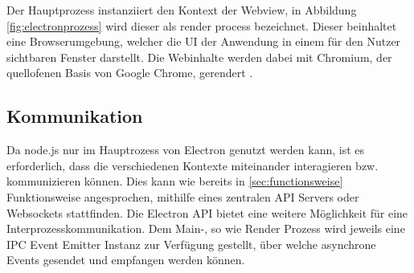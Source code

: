 Der Hauptprozess instanziiert den Kontext der Webview, in Abbildung \ref{fig:electronprozess} wird dieser als render process bezeichnet.
Dieser beinhaltet eine Browserumgebung, welcher die \ac{UI} der Anwendung in einem für den Nutzer sichtbaren Fenster darstellt.
Die Webinhalte werden dabei mit Chromium, der quellofenen Basis von Google Chrome, gerendert \cite{Build58:online}.

\subsection{Kommunikation}

Da node.js nur im Hauptrozess von Electron genutzt werden kann, ist es erforderlich,
dass die verschiedenen Kontexte miteinander interagieren bzw. kommunizieren können.
Dies kann wie bereits in \ref{sec:functionsweise} Funktionsweise angesprochen,
mithilfe eines zentralen API Servers oder Websockets stattfinden.
Die Electron API bietet eine weitere Möglichkeit für eine Interprozesskommunikation.
Dem Main-, so wie Render Prozess wird jeweils eine IPC Event Emitter Instanz zur Verfügung gestellt,
über welche asynchrone Events gesendet und empfangen werden können.
